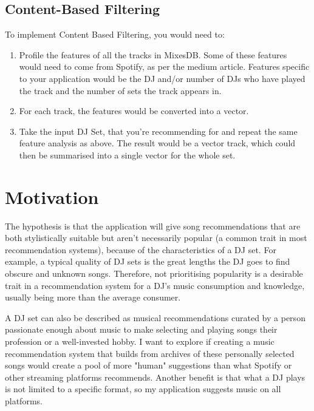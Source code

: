 \documentclass[11pt,titlepage,oneside]{book}
\begin{document}
  \subsection{Content-Based Filtering}
  To implement Content Based Filtering, you would need to:
 \begin{enumerate}
 	
 	\item  Profile the features of all the tracks in MixesDB. Some of these features would need to come from Spotify, as per the medium article. Features specific to your application would be the DJ and/or number of DJs who have played the track and the number of sets the track appears in.
 	
 	\item For each track, the features would be converted into a vector.
 	
 	\item Take the input DJ Set, that you're recommending for and repeat the same feature analysis as above. The result would be a vector track, which could then be summarised into a single vector for the whole set.
 	
 \end{enumerate}

\section{Motivation}

	The hypothesis is that the application will give song recommendations that are both stylistically suitable but aren't necessarily popular (a common trait in most recommendation systems), because of the characteristics of a DJ set. For example, a typical quality of DJ sets is the great lengths the DJ goes to find obscure and unknown songs. Therefore, not prioritising popularity is a desirable trait in a recommendation system for a DJ's music consumption and knowledge, usually being more than the average consumer. 
	
	\begin{flushleft}
		
		A DJ set can also be described as musical recommendations curated by a person passionate enough about music to make selecting and playing songs their profession or a well-invested hobby. I want to explore if creating a music recommendation system that builds from archives of these personally selected songs would create a pool of more "human" suggestions than what Spotify or other streaming platforms recommends. Another benefit is that what a DJ plays is not limited to a specific format, so my application suggests music on all platforms.
		
	\end{flushleft}
	
\end{document}
